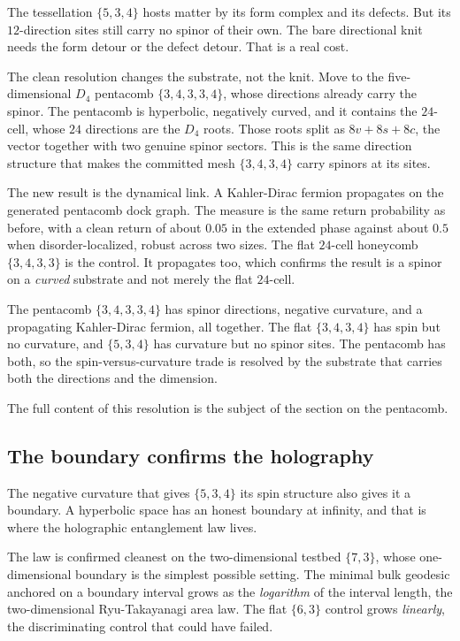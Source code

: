 The tessellation $\{5,3,4\}$ hosts matter by its form complex and its defects. But its $12$-direction sites still carry no spinor of their own. The bare directional knit needs the form detour or the defect detour. That is a real cost.

The clean resolution changes the substrate, not the knit. Move to the five-dimensional $D_4$ pentacomb $\{3,4,3,3,4\}$, whose directions already carry the spinor. The pentacomb is hyperbolic, negatively curved, and it contains the $24$-cell, whose $24$ directions are the $D_4$ roots. Those roots split as $8v + 8s + 8c$, the vector together with two genuine spinor sectors. This is the same direction structure that makes the committed mesh $\{3,4,3,4\}$ carry spinors at its sites.

The new result is the dynamical link. A Kahler-Dirac fermion propagates on the generated pentacomb dock graph. The measure is the same return probability as before, with a clean return of about $0.05$ in the extended phase against about $0.5$ when disorder-localized, robust across two sizes. The flat $24$-cell honeycomb $\{3,4,3,3\}$ is the control. It propagates too, which confirms the result is a spinor on a \emph{curved} substrate and not merely the flat $24$-cell.

\begin{result}
The pentacomb $\{3,4,3,3,4\}$ has spinor directions, negative curvature, and a propagating Kahler-Dirac fermion, all together. The flat $\{3,4,3,4\}$ has spin but no curvature, and $\{5,3,4\}$ has curvature but no spinor sites. The pentacomb has both, so the spin-versus-curvature trade is resolved by the substrate that carries both the directions and the dimension.
\end{result}

The full content of this resolution is the subject of the section on the pentacomb.

\subsection{The boundary confirms the holography}

The negative curvature that gives $\{5,3,4\}$ its spin structure also gives it a boundary. A hyperbolic space has an honest boundary at infinity, and that is where the holographic entanglement law lives.

The law is confirmed cleanest on the two-dimensional testbed $\{7,3\}$, whose one-dimensional boundary is the simplest possible setting. The minimal bulk geodesic anchored on a boundary interval grows as the \emph{logarithm} of the interval length, the two-dimensional Ryu-Takayanagi area law. The flat $\{6,3\}$ control grows \emph{linearly}, the discriminating control that could have failed.

